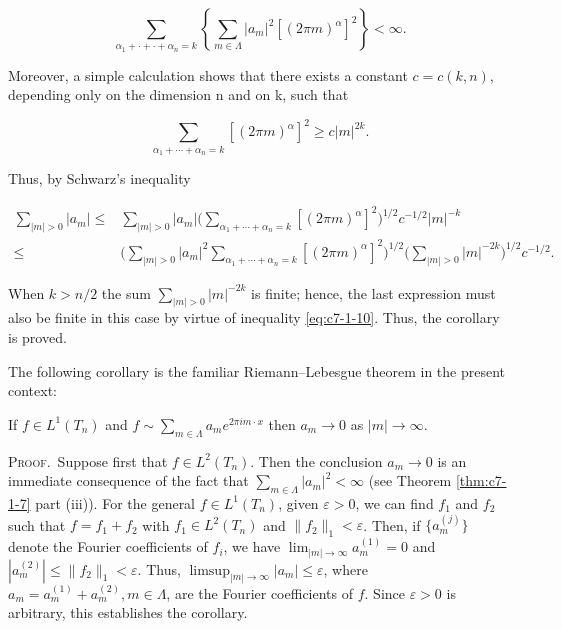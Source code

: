 \begin{equation}\label{eq:c7-1-10}
\sum_{\alpha_{1}+\cdot+\cdot+\alpha_{n}=k}\left\{\sum_{m\in\Lambda}|a_{m}|^{2}[(2\pi m)^{\alpha}]^{2}\right\}<\infty.
\end{equation}

Moreover, a simple calculation shows that there exists a constant $c = c(k, n)$, depending only on the dimension n and on k, such that

\[
\sum_{\alpha_{1}+\cdots+\alpha_{n}=k}[(2\pi m)^{\alpha}]^{2}\geq c|m|^{2k}.
\]

Thus, by Schwarz's inequality

\[
\begin{aligned}\sum_{|m|>0}|a_{m}|\leq&\sum_{|m|>0}|a_{m}|\biggl(\sum_{\alpha_{1}+\cdots+\alpha_{n}=k}[(2\pi m)^{\alpha}]^{2}\biggr)^{1/2}c^{-1/2}|m|^{-k}\\\leq&\biggl(\sum_{|m|>0}|a_{m}|^{2}\sum_{\alpha_{1}+\cdots+\alpha_{n}=k}[(2\pi m)^{\alpha}]^{2}\biggr)^{1/2}\biggl(\sum_{|m|>0}|m|^{-2k}\biggr)^{1/2}c^{-1/2}.\end{aligned}
\]

When $k > n/2$ the sum $\sum_{|m| > 0} |m|^{-2k}$ is finite; hence, the last expression must also be finite in this case by virtue of inequality \eqref{eq:c7-1-10}. Thus, the corollary is proved.

The following corollary is the familiar Riemann--Lebesgue theorem in the present context:

\begin{corollary}
\label{cor:c7-1-11}
If $f \in L^1(T_n)$ and $f \sim \sum_{m \in \Lambda} a_m e^{2\pi i m \cdot x}$ then $a_m \to 0$ as $|m| \to \infty$.
\end{corollary}

\textsc{Proof.}\ Suppose first that $f \in L^{2}(T_{n})$. Then the conclusion $a_{m} \to 0$ is an immediate consequence of the fact that $\sum_{m \in \Lambda} |a_{m}|^{2} < \infty$ (see Theorem \ref{thm:c7-1-7} part (iii)). For the general $f \in L^{1}(T_{n})$, given $\varepsilon > 0$, we can find $f_{1}$ and $f_{2}$ such that $f = f_{1} + f_{2}$ with $f_{1} \in L^{2}(T_{n})$ and $\|f_{2}\|_{1} < \varepsilon$. Then, if $\{a_{m}^{(j)}\}$ denote the Fourier coefficients of $f_{i}$, we have $\lim_{|m| \to \infty} a_{m}^{(1)} = 0$ and $|a_{m}^{(2)}| \leq \|f_{2}\|_{1} < \varepsilon$. Thus, $\limsup_{|m| \to \infty} |a_{m}| \leq \varepsilon$, where $a_{m} = a_{m}^{(1)} + a_{m}^{(2)}, m \in \Lambda$, are the Fourier coefficients of $f$. Since $\varepsilon > 0$ is arbitrary, this establishes the corollary.

